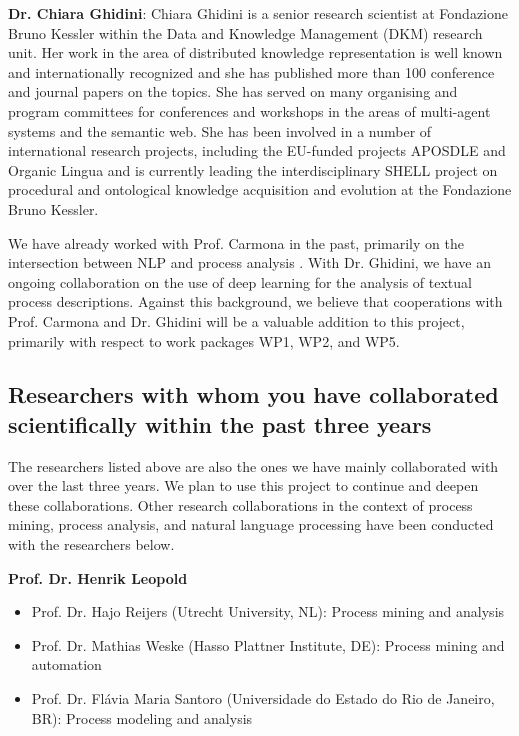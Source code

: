 \textbf{Dr. Chiara Ghidini}: Chiara Ghidini is a senior research scientist at Fondazione Bruno Kessler within the Data and Knowledge Management (DKM) research unit. Her work in the area of distributed knowledge representation is well known and internationally recognized and she has published more than 100 conference and journal papers on the topics. She has served on many organising and program committees for conferences and workshops in the areas of multi-agent systems and the semantic web. She has been involved in a number of international research projects, including the EU-funded projects APOSDLE and Organic Lingua and is currently leading the interdisciplinary SHELL project on procedural and ontological knowledge acquisition and evolution at the Fondazione Bruno Kessler. 

We have already worked with Prof. Carmona in the past, primarily on the intersection between NLP and process analysis \cite{sanchez2018aligning,van2018challenges}.  With Dr. Ghidini, we have an ongoing collaboration on the use of deep learning for the analysis of textual process descriptions. 
Against this background, we believe that cooperations with Prof. Carmona and Dr. Ghidini will be a valuable addition to this project, primarily with respect to work packages WP1, WP2, and WP5. 

\subsection{Researchers with whom you have collaborated scientifically within the past three years}


The researchers listed above are also the ones we have mainly collaborated with over the last three years. We plan to use this project to continue and deepen these collaborations. Other research collaborations in the context of process mining, process analysis, and natural language processing have been conducted with the researchers below.

\textbf{Prof. Dr. Henrik Leopold}

\begin{itemize}
\item Prof. Dr. Hajo Reijers (Utrecht University, NL): Process mining and analysis
\item Prof. Dr. Mathias Weske (Hasso Plattner Institute, DE): Process mining and automation
\item Prof. Dr. Flávia Maria Santoro (Universidade do Estado do Rio de Janeiro, BR): Process modeling and analysis
\end{itemize}

